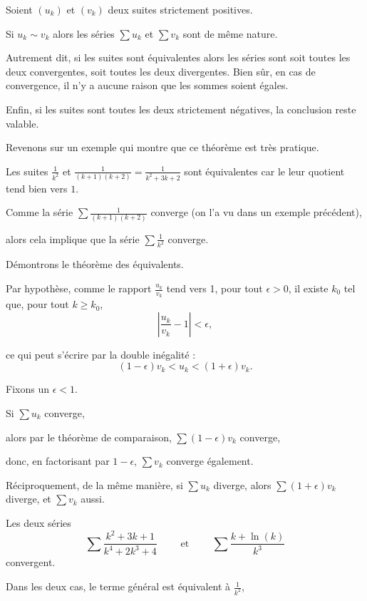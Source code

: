 Soient $(u_k)$ et $(v_k)$ deux suites strictement positives. 

\change
Si $u_k \sim v_k$ alors les séries $\sum u_k$ et $\sum v_k$ sont de même nature.

\change
Autrement dit, si les suites sont équivalentes alors les séries sont soit toutes les deux convergentes,
soit toutes les deux divergentes. Bien sûr, en cas de convergence, il n'y a aucune 
raison que les sommes soient égales. 

\change
Enfin, si les suites sont toutes les deux strictement négatives, la
conclusion reste valable.

\diapo

Revenons sur un exemple qui montre que ce théorème est très pratique.

\change
Les suites $\frac{1}{k^2}$ et $\frac{1}{(k+1)(k+2)}=\frac{1}{k^2+3k+2}$
sont équivalentes car le leur quotient tend bien vers $1$.

\change
Comme la série $\sum \frac{1}{(k+1)(k+2)}$ converge (on l'a vu dans un exemple précédent), 

\change
alors cela implique que la série $\sum \frac{1}{k^2}$ converge.

\change
Démontrons le théorème des équivalents.

\change
Par hypothèse, comme le rapport $ \frac{u_k}{v_k}$ tend vers 1, pour tout $\epsilon>0$, il existe $k_0$ tel que, pour
tout $k \ge k_0$,
$$\left|\frac{u_k}{v_k} -1\right| < \epsilon,$$

\change
ce qui peut s'écrire par la double inégalité : 
$$(1-\epsilon)v_k < u_k <(1+\epsilon) v_k.$$

\change
Fixons un $\epsilon <1$.

\change
Si $\sum u_k$ converge, 

\change
alors par le théorème de comparaison, $\sum(1-\epsilon) v_k$ converge, 

\change
donc, en factorisant par $1-\epsilon$, $\sum v_k$ converge également. 

\change
Réciproquement, de la même manière, si $\sum u_k$ diverge, alors
$\sum (1+\epsilon)v_k$ diverge, et $\sum v_k$ aussi.

\diapo

Les deux séries 
$$
\sum \frac{k^2+3k+1}{k^4+2k^3+4}
\qquad \text{ et } \qquad 
\sum \frac{k +\ln(k)}{k^3}
$$
convergent.

\change
Dans les deux cas, le terme général est équivalent à $\frac{1}{k^2}$, 


